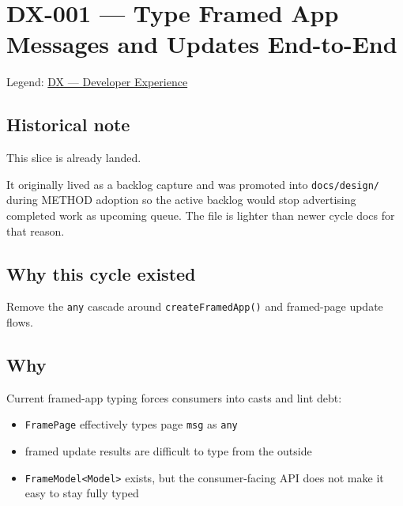\chapter{DX-001 --- Type Framed App Messages and Updates End-to-End}\label{record-120}

\smallskip

Legend: \href{https://github.com/flyingrobots/bijou/blob/1853ad902f6bf219326409e7f743a5a1d6517dbc/docs/legends/DX-developer-experience.md}{DX --- Developer Experience}

\section{Historical note}\label{record-120-historical-note}

This slice is already landed.

It originally lived as a backlog capture and was promoted into \texttt{d\allowbreak{}o\allowbreak{}c\allowbreak{}s\allowbreak{}/\allowbreak{}d\allowbreak{}e\allowbreak{}s\allowbreak{}i\allowbreak{}g\allowbreak{}n\allowbreak{}/} during METHOD adoption so the active backlog would stop advertising completed work as upcoming queue. The file is lighter than newer cycle docs for that reason.

\section{Why this cycle existed}\label{record-120-why-this-cycle-existed}

Remove the \texttt{a\allowbreak{}n\allowbreak{}y} cascade around \texttt{c\allowbreak{}r\allowbreak{}e\allowbreak{}a\allowbreak{}t\allowbreak{}e\allowbreak{}F\allowbreak{}r\allowbreak{}a\allowbreak{}m\allowbreak{}e\allowbreak{}d\allowbreak{}A\allowbreak{}p\allowbreak{}p\allowbreak{}(\allowbreak{})} and framed-page update flows.

\section{Why}\label{record-120-why}

Current framed-app typing forces consumers into casts and lint debt:

\begin{itemize}
\tightlist
\item
  \texttt{F\allowbreak{}r\allowbreak{}a\allowbreak{}m\allowbreak{}e\allowbreak{}P\allowbreak{}a\allowbreak{}g\allowbreak{}e} effectively types page \texttt{m\allowbreak{}s\allowbreak{}g} as \texttt{a\allowbreak{}n\allowbreak{}y}
\item
  framed update results are difficult to type from the outside
\item
  \texttt{F\allowbreak{}r\allowbreak{}a\allowbreak{}m\allowbreak{}e\allowbreak{}M\allowbreak{}o\allowbreak{}d\allowbreak{}e\allowbreak{}l\allowbreak{}<\allowbreak{}M\allowbreak{}o\allowbreak{}d\allowbreak{}e\allowbreak{}l\allowbreak{}>} exists, but the consumer-facing API does not make it easy to stay fully typed
\end{itemize}

